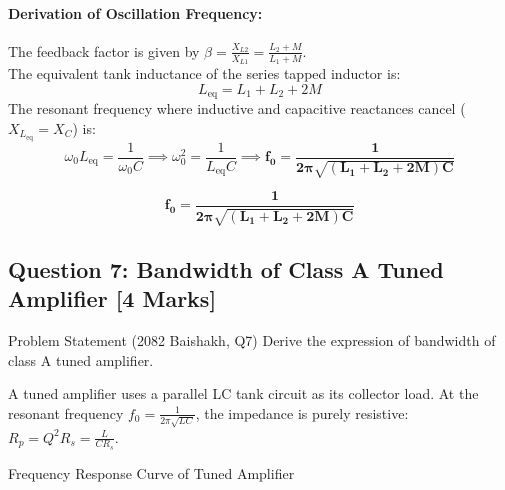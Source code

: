 \documentclass[11pt,a4paper,oneside]{book}
\begin{document}
\paragraph{Derivation of Oscillation Frequency:}
The feedback factor is given by $\beta = \frac{X_{L2}}{X_{L1}} = \frac{L_2 + M}{L_1 + M}$.\\
The equivalent tank inductance of the series tapped inductor is:
\[
L_{\text{eq}} = L_1 + L_2 + 2M
\]
The resonant frequency where inductive and capacitive reactances cancel ($X_{L_{\text{eq}}} = X_C$) is:
\[
\omega_0 L_{\text{eq}} = \frac{1}{\omega_0 C} \implies \omega_0^2 = \frac{1}{L_{\text{eq}} C} \implies \mathbf{f_0 = \frac{1}{2\pi \sqrt{(L_1 + L_2 + 2M)C}}}
\]

\begin{answerbox}
$$\mathbf{f_0 = \frac{1}{2\pi \sqrt{(L_1 + L_2 + 2M)C}}}$$
\end{answerbox}

\vspace{0.6cm}

\subsection{Question 7: Bandwidth of Class A Tuned Amplifier [4 Marks]}
\begin{questionbox}{Problem Statement (2082 Baishakh, Q7)}
Derive the expression of bandwidth of class A tuned amplifier.
\end{questionbox}

A tuned amplifier uses a parallel LC tank circuit as its collector load. At the resonant frequency $f_0 = \frac{1}{2\pi\sqrt{LC}}$, the impedance is purely resistive: $R_p = Q^2 R_s = \frac{L}{C R_s}$.

\begin{schematicbox}{Frequency Response Curve of Tuned Amplifier}
\centering
{}
\end{schematicbox}
\end{document}
